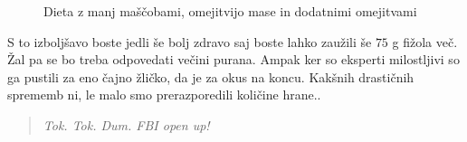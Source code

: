 \documentclass[a4paper]{article}
\begin{document}
\begin{figure}[H]
    \centering
    \caption{Dieta z manj maščobami, omejitvijo mase in dodatnimi omejitvami}
    \label{fig:fat-add}
\end{figure}

S to izboljšavo boste jedli še bolj zdravo saj boste lahko zaužili še $75$ g fižola več. Žal pa 
se bo treba odpovedati večini purana. Ampak ker so eksperti milostljivi so ga pustili za eno čajno 
žličko, da je za okus na koncu. Kakšnih drastičnih sprememb ni, le malo smo prerazporedili količine
hrane..

\begin{quote}
    \centering
    \textit{Tok. Tok. Dum. FBI open up!}
\end{quote}

\begin{figure}[H]
    \centering
\end{figure}
\end{document}
